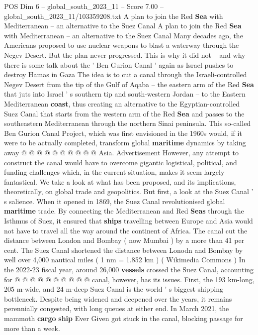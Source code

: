 \begin{textsample}{POS Dim 6 – global\_south\_2023\_11 – Score 7.00 – global\_south\_2023\_11/103359208.txt}  \label{ex:f6_pos_302}
A plan to join the Red \textbf{Sea} with Mediterranean -- an alternative to the Suez Canal A plan to join the Red \textbf{Sea} with Mediterranean -- an alternative to the Suez Canal Many decades ago, the Americans proposed to use nuclear weapons to blast a waterway through the Negev Desert.
But the plan never progressed.
This is why it did not -- and why there is some talk about the ' Ben Gurion Canal ' again as Israel pushes to destroy Hamas in Gaza The idea is to cut a canal through the Israeli-controlled Negev Desert from the tip of the Gulf of Aqaba -- the eastern arm of the Red \textbf{Sea} that juts into Israel ' s southern tip and south-western Jordan -- to the Eastern Mediterranean \textbf{coast}, thus creating an alternative to the Egyptian-controlled Suez Canal that starts from the western arm of the Red \textbf{Sea} and passes to the southeastern Mediterranean through the northern Sinai peninsula.
This so-called Ben Gurion Canal Project, which was first envisioned in the 1960s would, if it were to be actually completed, transform global \textbf{maritime} dynamics by taking away @ @ @ @ @ @ @ @ @ @ Asia.
Advertisement However, any attempt to construct the canal would have to overcome gigantic logistical, political, and funding challenges which, in the current situation, makes it seem largely fantastical.
We take a look at what has been proposed, and its implications, theoretically, on global trade and geopolitics.
But first, a look at the Suez Canal ' s salience.
When it opened in 1869, the Suez Canal revolutionised global \textbf{maritime} trade.
By connecting the Mediterranean and Red \textbf{Seas} through the Isthmus of Suez, it ensured that \textbf{ships} travelling between Europe and Asia would not have to travel all the way around the continent of Africa.
The canal cut the distance between London and Bombay ( now Mumbai ) by a more than 41 per cent.
The Suez Canal shortened the distance between Lonodn and Bombay by well over 4,000 nautical miles ( 1 nm = 1.852 km ) ( Wikimedia Commons ) In the 2022-23 fiscal year, around 26,000 \textbf{vessels} crossed the Suez Canal, accounting for @ @ @ @ @ @ @ @ @ @ canal, however, has its issues.
First, the 193 km-long, 205 m-wide, and 24 m-deep Suez Canal is the world ' s biggest shipping bottleneck.
Despite being widened and deepened over the years, it remains perennially congested, with long queues at either end.
In March 2021, the mammoth \textbf{cargo} \textbf{ship} Ever Given got stuck in the canal, blocking passage for more than a week.

\end{textsample}
